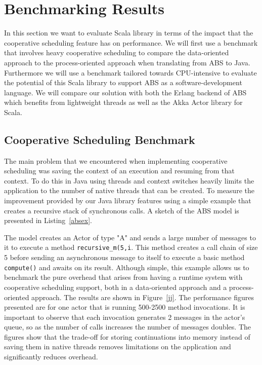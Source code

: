 \section{Benchmarking Results}
\label{bench}

In this section we want to evaluate Scala library in terms of the impact that the cooperative scheduling feature has on performance. We will first use a benchmark that involves heavy cooperative scheduling to compare the data-oriented approach to the process-oriented approach when translating from ABS to Java. Furthermore we will use a benchmark tailored towards CPU-intensive to evaluate the potential of this Scala library to support ABS as a software-development language. We will compare our solution with both the Erlang backend of ABS which benefits from lightweight threads as well as the Akka Actor library for Scala.

\subsection{Cooperative Scheduling Benchmark}
The main problem that we encountered when implementing cooperative scheduling was saving the context of an execution and resuming from that context. To do this in Java using threads and context switches heavily limits the application to the number of native threads that can be created.  To measure the improvement provided by our Java library features using a simple example that creates a recursive stack of synchronous calls.  A sketch of the ABS model is presented in Listing~\ref{absex}.
\par The model creates an Actor of type "A" and sends a large number of messages to it to execute a method \lstinline|recursive_m(5,i|. This method creates a call chain of size 5 before sending an asynchronous message to itself to execute a basic method \lstinline|compute()| and awaits on its result. Although simple, this example allows us to benchmark the pure overhead that arises from having a runtime system with cooperative scheduling support, both in a data-oriented approach and a process-oriented approach. The results are shown in Figure~\ref{jj}. The performance figures presented are for one actor that is running 500-2500 method invocations. It is important to observe that each invocation generates 2 messages in the actor's queue, so as the number of calls increases the number of messages doubles. The figures show that the trade-off for storing continuations into memory instead of saving them in native threads removes limitations on the application and significantly reduces overhead. 


